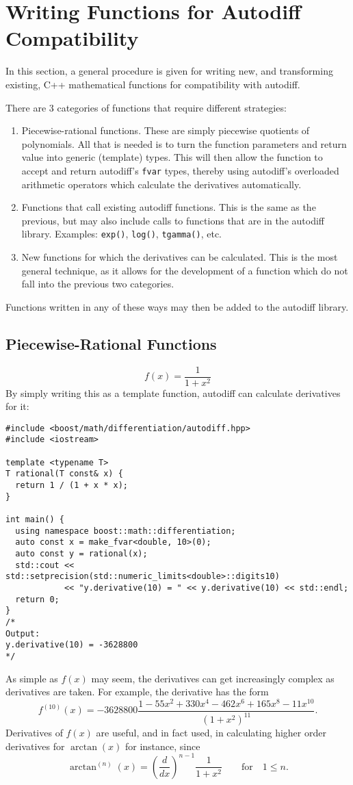 \documentclass{article}
\begin{document}
\section{Writing Functions for Autodiff Compatibility}\label{compatibility}

In this section, a general procedure is given for writing new, and transforming existing, C++ mathematical
functions for compatibility with autodiff.

There are 3 categories of functions that require different strategies:
\begin{enumerate}
\item Piecewise-rational functions. These are simply piecewise quotients of polynomials. All that is needed is to
    turn the function parameters and return value into generic (template) types. This will then allow the function
    to accept and return autodiff's {\tt fvar} types, thereby using autodiff's overloaded arithmetic operators
    which calculate the derivatives automatically.
\item Functions that call existing autodiff functions. This is the same as the previous, but may also include
    calls to functions that are in the autodiff library. Examples: {\tt exp()}, {\tt log()}, {\tt tgamma()}, etc.
\item New functions for which the derivatives can be calculated. This is the most general technique, as it
    allows for the development of a function which do not fall into the previous two categories.
\end{enumerate}
Functions written in any of these ways may then be added to the autodiff library.

\subsection{Piecewise-Rational Functions}
\[
f(x) = \frac{1}{1+x^2}
\]
By simply writing this as a template function, autodiff can calculate derivatives for it:
\begin{Verbatim}[xleftmargin=2em]
#include <boost/math/differentiation/autodiff.hpp>
#include <iostream>

template <typename T>
T rational(T const& x) {
  return 1 / (1 + x * x);
}

int main() {
  using namespace boost::math::differentiation;
  auto const x = make_fvar<double, 10>(0);
  auto const y = rational(x);
  std::cout << std::setprecision(std::numeric_limits<double>::digits10)
            << "y.derivative(10) = " << y.derivative(10) << std::endl;
  return 0;
}
/*
Output:
y.derivative(10) = -3628800
*/
\end{Verbatim}
As simple as $f(x)$ may seem, the derivatives can get increasingly complex as derivatives are taken.
For example, the  derivative has the form
\[
f^{(10)}(x) = -3628800\frac{1 - 55x^2 + 330x^4 - 462x^6 + 165x^8 - 11x^{10}}{(1 + x^2)^{11}}.
\]
Derivatives of $f(x)$ are useful, and in fact used, in calculating higher order derivatives for $\arctan(x)$
for instance, since
\[
\arctan^{(n)}(x) = \left(\frac{d}{dx}\right)^{n-1} \frac{1}{1+x^2}\qquad\text{for}\quad 1\le n.
\]
\end{document}
